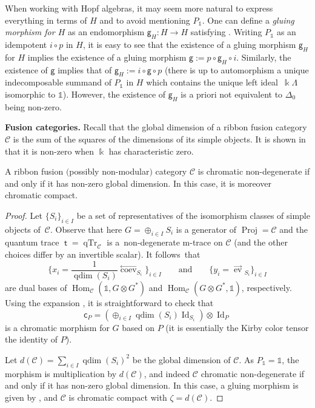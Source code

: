\documentclass[pdftex]{sigma}
\numberwithin{equation}{section}
\newcommand{\Proj}{\operatorname{Proj}}
\newcommand{\chr}{{\mathsf{c}}}
\newcommand{\gm}{{\mathsf{g}}}
\numberwithin{theorem}{section}
\numberwithin{proposition}{section}
\numberwithin{definition}{section}
\numberwithin{lemma}{section}
\numberwithin{corollary}{section}
\numberwithin{remark}{section}
\numberwithin{example}{section}
\newcommand{\rev}{\stackrel{\longrightarrow}{\operatorname{ev}}\!\!}
\newcommand{\lcoev}{\stackrel{\longleftarrow}{\operatorname{coev}}}
\newcommand{\cat}{\mathcal{C}}
\newcommand{\Hom}{\operatorname{Hom}}
\newcommand{\unit}{\ensuremath{\mathds{1}}}
\newcommand{\Id}{\operatorname{Id}}
\newcommand{\qdim}{\operatorname{qdim}}
\newcommand{\FK}{{\Bbbk}}
\newcommand{\kk}{\Bbbk}
\newcommand{\mt}{{\operatorname{\mathsf{t}}}}
\newcommand{\CC}{\mathcal{C}}
\begin{document}
When working with Hopf algebras, it may
seem more natural to express everything in terms of $H$ and to avoid
mentioning $P_\unit$. One can define a \emph{gluing morphism for $H$}
as an endomorphism $\gm_H\colon H\to H$ satisfying
\smash{$\gm_H\circ \Delta_0^H=\Lambda_H$}. Writing $P_\unit$ as an idempotent
$i \circ p$ in $H$, it is easy to see that the existence of a gluing
morphism $\gm_H$ for $H$ implies the existence of a gluing morphism
$\gm:= p\circ \gm_H\circ i$. Similarly, the existence of $\gm$ implies
that of $\gm_H:= i\circ\gm\circ p$
(there is up to automorphism a unique indecomposable summand of
$P_\unit$ in $H$ which contains the unique left ideal~$\FK\Lambda$ isomorphic to $\unit$).
However, the
existence of $\gm_H$ is a priori not equivalent to $\Delta_0$ being
non-zero.

{\bf Fusion categories.} Recall that the global dimension of a ribbon fusion category $\cat$ is
the sum of the squares of the dimensions of its simple
objects. It is
shown in~\cite[Theorem~7.21.12]{EGNO} that it is non-zero when $\FK$
has characteristic zero.
\begin{proposition}\label{prop:semisimpleCompact}
 A ribbon fusion $($possibly non-modular$)$ category $\cat$ is chromatic non-degen\-er\-ate if and only if it has non-zero
 global dimension. In this case, it is moreover chromatic compact.
\end{proposition}
\begin{proof}
 Let $
\{S_i\}_{i\in I}$ be a set of representatives of the isomorphism
classes of simple objects of~$\cat$.
Observe that here $G=\oplus_{i\in I} S_i$ is
a generator of $\Proj=\cat$ and
the quantum trace $\mt=\operatorname{qTr}_\cat$ is
a~non-degenerate m-trace on $ \cat$ (and the other choices differ by an invertible scalar). It follows~that
\[
\biggl\{x_i=\frac{1}{\qdim(S_i)}\lcoev_{S_i}\biggr\}_{i\in I} \qquad\text{and}\qquad \bigl\{y_i=\rev_{S_i}\bigr\}_{i\in I}
\]
 are dual bases of $\Hom_\cat(\unit,G \otimes G^*)$ and $\Hom_\cat(G\otimes G^*,\unit)$, respectively. Using the expansion
\smash{$\Omega_{G\otimes G^*}=\sum_{i\in I} x_i\otimes_\kk y_i$}, it is straightforward to check that
\[\chr_P=(\oplus_{i\in I} \qdim(S_i)\Id_{S_i})\otimes \Id_P\]
is a chromatic morphism for $G$ based on $P$ (it is essentially the
Kirby color tensor the identity of $P$).

Let $d(\cat)= \sum_{i\in I} \qdim(S_i)^2$ be the global dimension of
$\cat$.
As $P_\unit=\unit$, the
morphism \smash{$\Delta_0^{P_\unit}$} is multiplication by $d(\cat)$, and indeed $\CC$ chromatic non-degenerate if and only if it has non-zero
 global dimension. In this case, a gluing morphism
is given by \smash{$\frac{1}{d(\cat)}{\rm Id}_\unit$}, and
$\cat$ is chromatic compact with $\zeta = d(\cat)$.
\end{proof}
\end{document}
